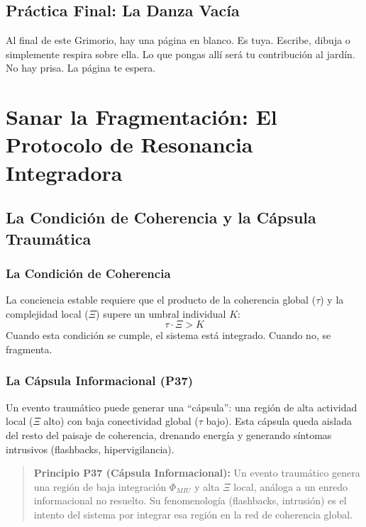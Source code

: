 \documentclass[12pt,openany]{book}
\begin{document}
\chapter{Práctica Final: La Danza Vacía}
\begin{practica}
Al final de este Grimorio, hay una página en blanco. Es tuya. Escribe,
dibuja o simplemente respira sobre ella. Lo que pongas allí será tu
contribución al jardín. No hay prisa. La página te espera.
\end{practica}

\part{Sanar la Fragmentación: El Protocolo de Resonancia Integradora}

\chapter{La Condición de Coherencia y la Cápsula Traumática}

\section{La Condición de Coherencia}
La conciencia estable requiere que el producto de la coherencia global
($\tau$) y la complejidad local ($\Xi$) supere un umbral individual $K$:
\[
\tau \cdot \Xi > K
\]
Cuando esta condición se cumple, el sistema está integrado. Cuando no,
se fragmenta.

\section{La Cápsula Informacional (P37)}
Un evento traumático puede generar una ``cápsula'': una región de alta
actividad local ($\Xi$ alto) con baja conectividad global ($\tau$ bajo).
Esta cápsula queda aislada del resto del paisaje de coherencia,
drenando energía y generando síntomas intrusivos (flashbacks,
hipervigilancia).

\begin{quote}
\textbf{Principio P37 (Cápsula Informacional):} Un evento traumático
genera una región de baja integración $\Phi_{MIU}$ y alta $\Xi$ local,
análoga a un enredo informacional no resuelto. Su fenomenología
(flashbacks, intrusión) es el intento del sistema por integrar esa
región en la red de coherencia global.
\end{quote}
\end{document}
